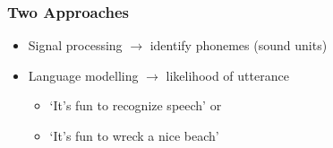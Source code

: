 \begin{frame}
\frametitle{Two Approaches} 
\begin{itemize}
\item Signal processing $\longrightarrow$ identify phonemes (sound units)
\item Language modelling $\longrightarrow$ likelihood of utterance
	\begin{itemize}
	\item `It's fun to recognize speech' or
	\item `It's fun to wreck a nice beach'
	\end{itemize}
\end{itemize}
\end{frame}